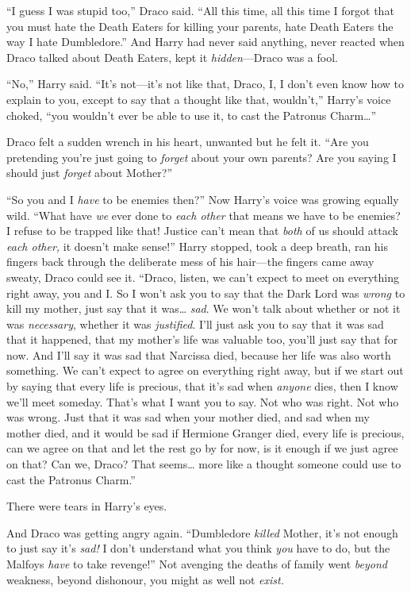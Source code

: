 ``I guess I was stupid too,'' Draco said. ``All this time, all this time
I forgot that you must hate the Death Eaters for killing your parents,
hate Death Eaters the way I hate Dumbledore.'' And Harry had never said
anything, never reacted when Draco talked about Death Eaters, kept it
\emph{hidden}---Draco was a fool.

``No,'' Harry said. ``It's not---it's not like that, Draco, I, I don't
even know how to explain to you, except to say that a thought like that,
wouldn't,'' Harry's voice choked, ``you wouldn't ever be able to use it,
to cast the Patronus Charm\ldots{}''

Draco felt a sudden wrench in his heart, unwanted but he felt it. ``Are
you pretending you're just going to \emph{forget} about your own
parents? Are you saying I should just \emph{forget} about Mother?''

``So you and I \emph{have} to be enemies then?'' Now Harry's voice was
growing equally wild. ``What have \emph{we} ever done to \emph{each
other} that means we have to be enemies? I refuse to be trapped like
that! Justice can't mean that \emph{both} of us should attack \emph{each
other,} it doesn't make sense!'' Harry stopped, took a deep breath, ran
his fingers back through the deliberate mess of his hair---the fingers
came away sweaty, Draco could see it. ``Draco, listen, we can't expect
to meet on everything right away, you and I. So I won't ask you to say
that the Dark Lord was \emph{wrong} to kill my mother, just say that it
was\ldots{} \emph{sad}. We won't talk about whether or not it was
\emph{necessary}, whether it was \emph{justified}. I'll just ask you to
say that it was sad that it happened, that my mother's life was valuable
too, you'll just say that for now. And I'll say it was sad that Narcissa
died, because her life was also worth something. We can't expect to
agree on everything right away, but if we start out by saying that every
life is precious, that it's sad when \emph{anyone} dies, then I know
we'll meet someday. That's what I want you to say. Not who was right.
Not who was wrong. Just that it was sad when your mother died, and sad
when my mother died, and it would be sad if Hermione Granger died, every
life is precious, can we agree on that and let the rest go by for now,
is it enough if we just agree on that? Can we, Draco? That seems\ldots{}
more like a thought someone could use to cast the Patronus Charm.''

There were tears in Harry's eyes.

And Draco was getting angry again. ``Dumbledore \emph{killed} Mother,
it's not enough to just say it's \emph{sad!} I don't understand what you
think \emph{you} have to do, but the Malfoys \emph{have} to take
revenge!'' Not avenging the deaths of family went \emph{beyond}
weakness, beyond dishonour, you might as well not \emph{exist.}

